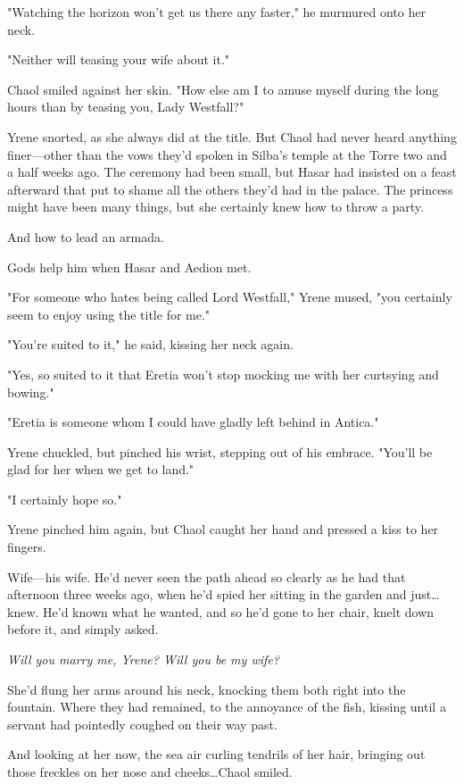 "Watching the horizon won't get us there any faster," he murmured onto her neck.

"Neither will teasing your wife about it."

Chaol smiled against her skin.
"How else am I to amuse myself during the long hours than by teasing you, Lady Westfall?"

Yrene snorted, as she always did at the title.
But Chaol had never heard anything finer---other than the vows they'd spoken in Silba's temple at the Torre two and a half weeks ago.
The ceremony had been small, but Hasar had insisted on a feast afterward that put to shame all the others they'd had in the palace.
The princess might have been many things, but she certainly knew how to throw a party.

And how to lead an armada.

Gods help him when Hasar and Aedion met.

"For someone who hates being called Lord Westfall," Yrene mused, "you certainly seem to enjoy using the title for me."

"You're suited to it," he said, kissing her neck again.

"Yes, so suited to it that Eretia won't stop mocking me with her curtsying and bowing."

"Eretia is someone whom I could have gladly left behind in Antica."

Yrene chuckled, but pinched his wrist, stepping out of his embrace.
"You'll be glad for her when we get to land."

"I certainly hope so."

Yrene pinched him again, but Chaol caught her hand and pressed a kiss to her fingers.

Wife---his wife.
He'd never seen the path ahead so clearly as he had that afternoon three weeks ago, when he'd spied her sitting in the garden and just\ldots knew.
He'd known what he wanted, and so he'd gone to her chair, knelt down before it, and simply asked.

\emph{Will you marry me, Yrene?
Will you be my wife?}

She'd flung her arms around his neck, knocking them both right into the fountain.
Where they had remained, to the annoyance of the fish, kissing until a servant had pointedly coughed on their way past.

And looking at her now, the sea air curling tendrils of her hair, bringing out those freckles on her nose and cheeks\ldots Chaol smiled.

